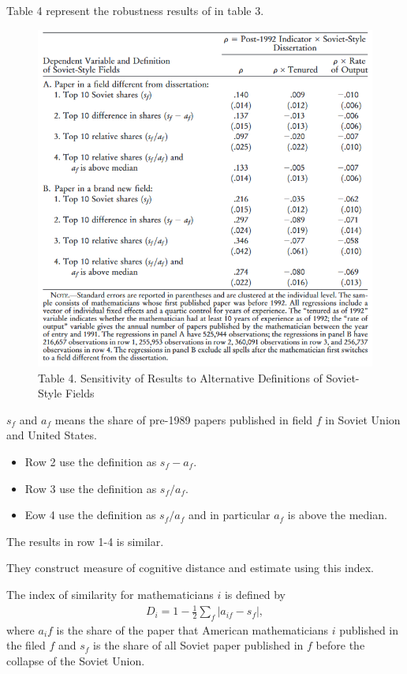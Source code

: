 \documentclass[../root]{subfiles}
\begin{document}
    Table 4 represent the robustness results of in table 3.
    \begin{figure}
        \centering
        \includegraphics[width = \linewidth]{_images/0918sugiyama/Table_4.png}
        \caption{Table 4. Sensitivity of Results to Alternative Definitions of Soviet-Style Fields}
        \label{fig:my_label}
    \end{figure}
    
    $s_f$ and $a_f $ means the share of pre-1989 papers published in field $f$ in Soviet Union and United States. 
    \begin{itemize}
        \item Row 2 use the definition as $s_f - a_f$. 
        \item Row 3 use the definition as $s_f/a_f$.
        \item Eow 4 use the definition as $s_f/a_f$ and in particular $a_f$ is above the median.
    \end{itemize}
    
    The results in row 1-4 is similar.
    
    They construct measure of cognitive distance and estimate using this index.
    
    The index of similarity for mathematicians $i$ is defined by 
    \begin{align}
        D_i = 1- \frac{1}{2}\sum_f |a_{if} - s_f|,
    \end{align}
    where $a_if$ is the share of the paper that American mathematicians $i$ published in the filed $f$ and $s_f$ is the share of all Soviet paper published in $f$ before the collapse of the Soviet Union. 
    
\end{document}
